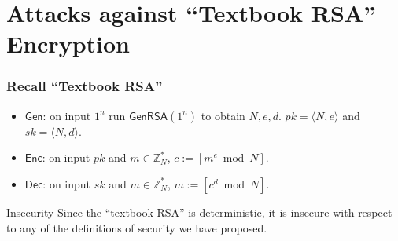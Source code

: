 \section{Attacks against ``Textbook RSA'' Encryption}
\begin{frame}\frametitle{Recall ``Textbook RSA''}
\begin{construction}
\begin{itemize}
\item $\mathsf{Gen}$: on input $1^n$ run $\mathsf{GenRSA}(1^n)$ to obtain $N,e,d$. $pk = \langle N,e \rangle$ and $sk = \langle N,d \rangle$.
\item $\mathsf{Enc}$: on input $pk$ and $m \in \mathbb{Z}^*_N$, $c:= [m^e \bmod N]$.
\item $\mathsf{Dec}$: on input $sk$ and $m \in \mathbb{Z}^*_N$, $m:= [c^d \bmod N]$.
\end{itemize}
\end{construction}
\begin{alertblock}{Insecurity}
Since the ``textbook RSA'' is deterministic, it is insecure with respect to any of the definitions of security we have proposed. 
\end{alertblock}
\end{frame}
%
